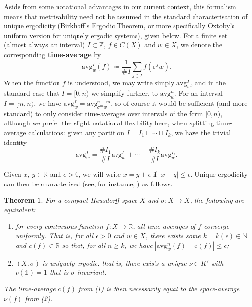 \documentclass[11pt]{amsart}
\numberwithin{equation}{section}
\theoremstyle{plain}
\newtheorem{theorem}{Theorem}[section]
\theoremstyle{definition}
\newcommand{\Z}{{\mathbb Z}}
\newcommand{\R}{{\mathbb R}}
\newcommand{\N}{{\mathbb N}}
\newcommand{\bbo}{\mathds{1}} %
\newcommand{\avg}{\mathrm{avg}}
\begin{document}
Aside from some notational advantages in our current context, this formalism means that metrisability need not be assumed in the standard characterisation of unique ergodicity (Birkhoff's Ergodic Theorem, or more specifically Oxtoby's uniform version for uniquely ergodic systems), given below. For a finite set (almost always an interval) \(I \subset \Z\), \(f \in C(X)\) and \(w \in X\), we denote the corresponding \textbf{time-average} by
\[
\avg^I_w(f) \coloneqq \frac{1}{\# I} \sum_{j \in I} f(\sigma^j w) .
\]
When the function \(f\) is understood, we may write simply \(\avg_w^I\), and in the standard case that \(I = [0,n)\) we simplify further, to \(\avg_w^n\). For an interval \(I = [m,n)\), we have \(\avg_w^I = \avg_{\sigma^m w}^{n-m}\), so of course it would be sufficient (and more standard) to only consider time-averages over intervals of the form \([0,n)\), although we prefer the slight notational flexibility here, when splitting time-average calculations: given any partition \(I = I_1 \sqcup \cdots \sqcup I_k\), we have the trivial identity
\begin{equation} \label{eq:split average}
\avg^I_w = \frac{\# I_1}{\# I} \avg^{I_1}_w + \cdots + \frac{\# I_k}{\# I} \avg^{I_k}_w .
\end{equation}

Given \(x\), \(y \in \R\) and \(\epsilon > 0\), we will write \(x = y \pm \epsilon\) if \(|x-y| \leq \epsilon\). Unique ergodicity can then be characterised (see, for instance, \cite[Theorem 10.6]{EFHN15}) as follows:

\begin{theorem} \label{thm:UE characterisation}
For a compact Hausdorff space \(X\) and \(\sigma \colon X \to X\), the following are equivalent:
\begin{enumerate}
	\item for every continuous function \(f \colon X \to \R\), all time-averages of \(f\) converge uniformly. That is, for all \(\epsilon > 0\) and \(w \in X\), there exists some \(k = k(\epsilon) \in \N\) and \(c(f) \in \R\) so that, for all \(n \geq k\), we have \(|\avg_w^n(f) - c(f)| \leq \epsilon\);
	\item \((X,\sigma)\) is uniquely ergodic, that is, there exists a unique \(\nu \in K'\) with \(\nu(\bbo) = 1\) that is \(\sigma\)-invariant.
\end{enumerate}
The time-average \(c(f)\) from (1) is then necessarily equal to the space-average \(\nu(f)\) from (2).
\end{theorem}
\end{document}

